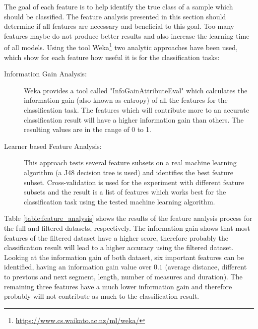 The goal of each feature is to help identify the true class of a sample which should be classified. The feature analysis presented in this section should determine if all features are necessary and beneficial to this goal. Too many features maybe do not produce better results and also increase the learning time of all models. Using the tool Weka\footnote{\url{https://www.cs.waikato.ac.nz/ml/weka/}} two analytic approaches have been used, which show for each feature how useful it is for the classification tasks:

\begin{description}

\item[Information Gain Analysis:] Weka provides a tool called "InfoGainAttributeEval" which calculates the information gain (also known as entropy) of all the features for the classification task. The features which will contribute more to an accurate classification result will have a higher information gain than others. The resulting values are in the range of 0 to 1.

\item[Learner based Feature Analysis:] This approach tests several feature subsets on a real machine learning algorithm (a J48 decision tree is used) and identifies the best feature subset. Cross-validation is used for the experiment with different feature subsets and the result is a list of features which works best for the classification task using the tested machine learning algorithm. %

\end{description}

Table \ref{table:feature_analysis} shows the results of the feature analysis process for the full and filtered datasets, respectively. The information gain shows that most features of the filtered dataset have a higher score, therefore probably the classification result will lead to a higher accuracy using the filtered dataset. Looking at the information gain of both dataset, six important features can be identified, having an information gain value over $0.1$ (average distance, different to previous and next segment, length, number of measures and duration). The remaining three features have a much lower information gain and therefore probably will not contribute as much to the classification result.


